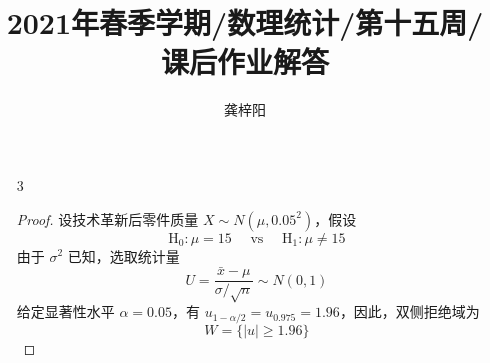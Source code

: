 \documentclass[normal,founder,mtpro2,cn]{elegantnote}
\title{2021年春季学期/数理统计/第十五周/课后作业解答}
\author{龚梓阳}
\date{\zhtoday}
\begin{document}
\maketitle
\begin{enumerate}
    \item[3]
        \begin{proof}
            设技术革新后零件质量 $X\sim N\left(\mu,0.05^{2}\right)$，假设
            \begin{equation*}
                \mathrm{H}_{0}:\mu=15\quad\text{ vs }\quad\mathrm{H}_{1}:\mu\neq 15
            \end{equation*}
            由于 $\sigma^{2}$ 已知，选取统计量
            \begin{equation*}
                U=\frac{\bar{x}-\mu}{\sigma/\sqrt{n}}\sim N(0,1)
            \end{equation*}
            给定显著性水平 $\alpha=0.05$，有 $u_{1-\alpha/2}=u_{0.975}=1.96$，因此，双侧拒绝域为
            \begin{equation*}
                W=\{|u|\geq 1.96\}
            \end{equation*}


\end{proof}
\end{enumerate}
\end{document}
